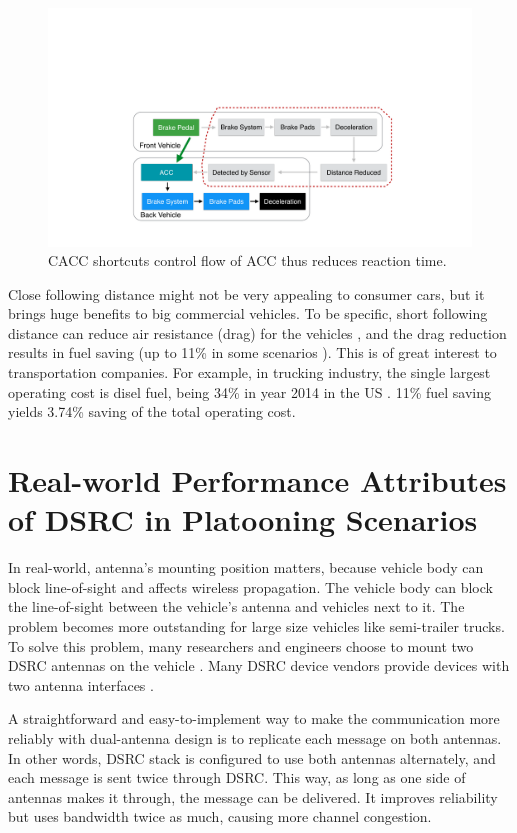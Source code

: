 \documentclass[12pt]{report}
\begin{document}
\begin{figure}[htb]
  \begin{center}
    \includegraphics[width=.7\columnwidth]{figures/brake.pdf}
    \caption{\label{fig:brake}CACC shortcuts control flow of ACC thus reduces reaction time.}
  \end{center}
\end{figure}

Close following distance might not be very appealing to consumer cars, but it brings huge benefits to big commercial vehicles. To be specific, short following distance can reduce air resistance (drag) for the vehicles \cite{watts2015computational,fhwa2015report}, and the drag reduction results in fuel saving (up to 11\% in some scenarios \cite{lammert2014effect}). This is of great interest to transportation companies. For example, in trucking industry, the single largest operating cost is disel fuel, being 34\% in year 2014 in the US \cite{atri2015analysis}. 11\% fuel saving yields 3.74\% saving of the total operating cost.

\section{Real-world Performance Attributes of DSRC in Platooning Scenarios}

\label{sec:background_realworld_performance}

In real-world, antenna's mounting position matters, because vehicle body can block line-of-sight and affects wireless propagation. The vehicle body can block the line-of-sight between the vehicle's antenna and vehicles next to it. The problem becomes more outstanding for large size vehicles like semi-trailer trucks. To solve this problem, many researchers and engineers choose to mount two DSRC antennas on the vehicle \cite{Bergenhem20121222,peloton}. Many DSRC device vendors provide devices with two antenna interfaces \cite{aradasystems,denso,unex}.

A straightforward and easy-to-implement way to make the communication more reliably with dual-antenna design is to replicate each message on both antennas. In other words, DSRC stack is configured to use both antennas alternately, and each message is sent twice through DSRC. This way, as long as one side of antennas makes it through, the message can be delivered. It improves reliability but uses bandwidth twice as much, causing more channel congestion.
\end{document}
